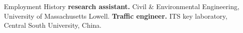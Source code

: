 \begin{rubric}{Employment History}
%
\entry*[2017 -- now]%
	\textbf{research assistant.} Civil \& Environmental Engineering, University of Massachusetts Lowell.
%
%
\entry*[2015 -- 2017]%
	\textbf{Traffic engineer.} ITS key laboratory, Central South University, China. 
%
\end{rubric}
